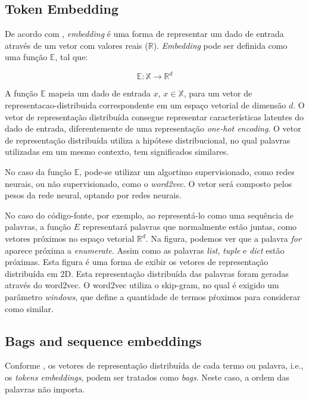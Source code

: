 \subsection{Token Embedding}

De acordo com \cite{cambronero-deep-learning-code-search:2019}, \textit{embedding} é uma forma de representar um dado de entrada através de um vetor com valores reais ($\mathbb{R}$). \textit{Embedding} pode ser definida como uma função $\mathbb{E}$, tal que:

\begin{equation}
    \mathbb{E}: \mathbb{X} \rightarrow \mathbb{R}^{d}
\end{equation}

A função $\mathbb{E}$ mapeia um dado de entrada $x$, $x \in \mathbb{X}$, para um vetor de \gls{representacao-distribuida} correspondente em um espaço vetorial de dimensão $d$. O vetor de representação distribuída consegue representar características latentes do dado de entrada, diferentemente de uma representação \textit{one-hot encoding}. O vetor de representação distribuída utiliza a hipótese distribucional, no qual palavras utilizadas em um mesmo contexto, tem significados similares.

No caso da função $\mathbb{E}$, pode-se utilizar um algortimo supervisionado, como redes neurais, ou não supervisionado, como o \textit{word2vec}. O vetor será composto pelos pesos da rede neural, optando por redes neurais. 

No caso do código-fonte, por exemplo, ao representá-lo como uma sequência de palavras, a função $E$ representará palavras que normalmente estão juntas, como vetores próximos no espaço vetorial $\mathbb{R}^{d}$. Na figura, podemos ver que a palavra \emph{for} aparece próxima a \emph{enumerate}. Assim como as palavras \emph{list}, \emph{tuple} e \emph{dict} estão próximas. 
Esta figura é uma forma de exibir os vetores de representação distribuída em 2D. Esta representação distribuída das palavras foram geradas através do word2vec. O word2vec utiliza o skip-gram, no qual é exigido um parâmetro \textit{windows}, que define a quantidade de termos pŕoximos para considerar como similar. 


\subsection{Bags and sequence embeddings}

Conforme \cite{cambronero-deep-learning-code-search:2019}, os vetores de representação distribuída de cada termo ou palavra, i.e., os \textit{tokens embeddings}, podem ser tratados como \textit{bags}. Neste caso, a ordem das palavras não importa.


